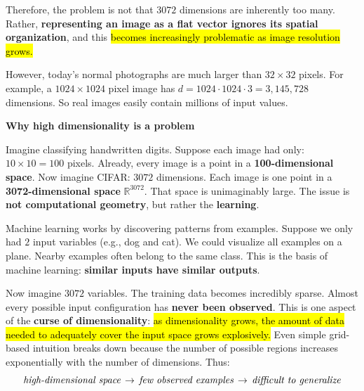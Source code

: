 \highspace
Therefore, the problem is not that $3072$ dimensions are inherently too many. Rather, \textbf{representing an image as a flat vector ignores its spatial organization}, and this \hl{becomes increasingly problematic as image resolution grows.}

\highspace
However, today's normal photographs are much larger than $32 \times 32$ pixels. For example, a $1024 \times 1024$ pixel image has $d = 1024 \cdot 1024 \cdot 3 = 3,145,728$ dimensions. So real images easily contain millions of input values.

\highspace
\begin{flushleft}
    \textcolor{Red2}{ \textbf{Why high dimensionality is a problem}}
\end{flushleft}
Imagine classifying handwritten digits. Suppose each image had only: $10 \times 10 = 100$ pixels. Already, every image is a point in a \textbf{100-dimensional space}. Now imagine CIFAR: $3072$ dimensions. Each image is one point in a \textbf{3072-dimensional space} $\mathbb{R}^{3072}$. That space is unimaginably large. The issue is \textbf{not computational geometry}, but rather the \textbf{learning}.

\highspace
Machine learning works by discovering patterns from examples. Suppose we only had $2$ input variables (e.g., dog and cat). We could visualize all examples on a plane. Nearby examples often belong to the same class. This is the basis of machine learning: \textbf{similar inputs have similar outputs}.

\highspace
Now imagine $3072$ variables. The training data becomes incredibly sparse. Almost every possible input configuration has \textbf{never been observed}. This is one aspect of the \textbf{curse of dimensionality}: \hl{as dimensionality grows, the amount of data needed to adequately cover the input space grows explosively.} Even simple grid-based intuition breaks down because the number of possible regions increases exponentially with the number of dimensions. Thus:
\begin{equation*}
    \emph{high-dimensional space} \, \to \, \emph{few observed examples} \, \to \, \emph{difficult to generalize}
\end{equation*}

